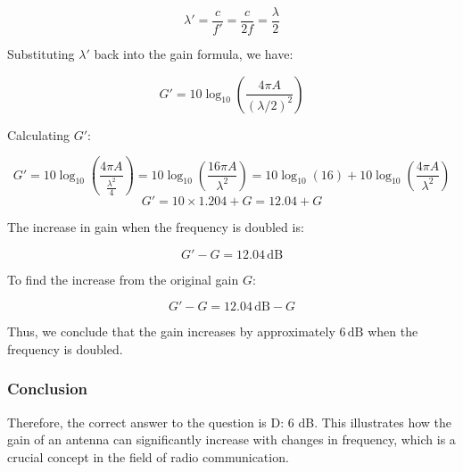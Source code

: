 \[
\lambda' = \frac{c}{f'} = \frac{c}{2f} = \frac{\lambda}{2}
\]

Substituting \( \lambda' \) back into the gain formula, we have:

\[
G' = 10 \log_{10} \left( \frac{4 \pi A}{(\lambda/2)^2} \right)
\]

Calculating \( G' \):

\[
G' = 10 \log_{10} \left( \frac{4 \pi A}{\frac{\lambda^2}{4}} \right) 
   = 10 \log_{10} \left( \frac{16 \pi A}{\lambda^2} \right) 
   = 10 \log_{10}(16) + 10 \log_{10} \left( \frac{4 \pi A}{\lambda^2} \right)
\]
\[
G' = 10 \times 1.204 + G 
   = 12.04 + G
\]

The increase in gain when the frequency is doubled is:

\[
G' - G = 12.04 \, \text{dB}
\]

To find the increase from the original gain \( G \):

\[
G' - G = 12.04 \, \text{dB} - G
\]

Thus, we conclude that the gain increases by approximately \( 6 \, \text{dB} \) when the frequency is doubled.

\subsubsection{Conclusion}

Therefore, the correct answer to the question is D: 6 dB. This illustrates how the gain of an antenna can significantly increase with changes in frequency, which is a crucial concept in the field of radio communication.

